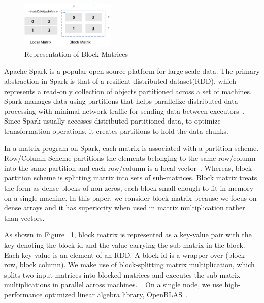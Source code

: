 \documentclass[10pt, conference, compsocconf]{IEEEtran}
\begin{document}


\begin{figure}[htp]
    \centering\includegraphics[width=0.4\textwidth]{figures/BlockMatrix.pdf}\caption{\label{fig:blockmatrix}Representation of Block Matrices}
\end{figure}

Apache Spark is a popular open-source platform for large-scale data. The primary abstraction in Spark is that of a resilient distributed
dataset(RDD), which represents a read-only collection of objects partitioned across a set of machines. Spark manages data using partitions that helps parallelize distributed data processing with minimal network traffic for sending data between executors~\cite{meng2016mllib}. Since Spark usually accesses distributed partitioned data, to optimize transformation operations, it creates partitions to hold the data chunks. 
   
In a matrix program on Spark, each matrix is associated with a partition scheme. Row/Column Scheme partitions the elements belonging to the same row/column into the same partition and each row/column is a local vector~\cite{yu2015exploiting}. Whereas, block partition scheme is splitting matrix into sets of sub-matrices. Block matrix treats the form as dense blocks of non-zeros, each block small enough to fit in memory on a single machine. In this paper, we consider block matrix because we focus on dense arrays and it has superiority when used in matrix multiplication rather than vectors. 

As shown in Figure ~\ref{fig:blockmatrix}, block matrix is represented as a key-value pair with the key denoting the block id and the value carrying the sub-matrix in the block. Each key-value is an element of an RDD. A block id is a wrapper over (block row, block column). We make use of block-splitting matrix multiplication, which splits two input matrices into blocked matrices and executes the sub-matrix multiplications in parallel across machines.~\cite{gu2015efficient}. On a single node, we use high-performance optimized linear algebra library, OpenBLAS~\cite{xianyi2014openblas}.
\end{document}
